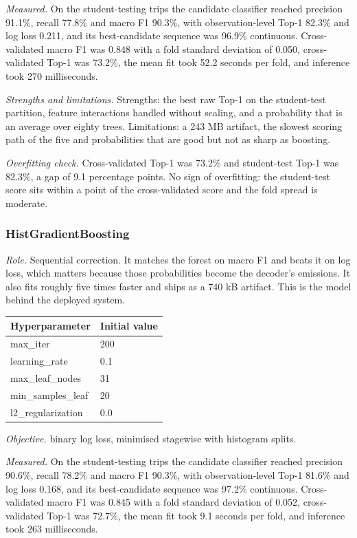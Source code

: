 \documentclass[11pt,a4paper]{article}
\begin{document}
\noindent\textit{Measured.} On the student-testing trips the candidate classifier reached precision 91.1\%, recall 77.8\% and macro F1 90.3\%, with observation-level Top-1 82.3\% and log loss 0.211, and its best-candidate sequence was 96.9\% continuous. Cross-validated macro F1 was 0.848 with a fold standard deviation of 0.050, cross-validated Top-1 was 73.2\%, the mean fit took 52.2 seconds per fold, and inference took 270 milliseconds.

\noindent\textit{Strengths and limitations.} Strengths: the best raw Top-1 on the student-test partition, feature interactions handled without scaling, and a probability that is an average over eighty trees. Limitations: a 243 MB artifact, the slowest scoring path of the five and probabilities that are good but not as sharp as boosting.

\noindent\textit{Overfitting check.} Cross-validated Top-1 was 73.2\% and student-test Top-1 was 82.3\%, a gap of 9.1 percentage points. No sign of overfitting: the student-test score sits within a point of the cross-validated score and the fold spread is moderate.

\subsubsection*{HistGradientBoosting}
\noindent\textit{Role.} Sequential correction. It matches the forest on macro F1 and beats it on log loss, which matters because those probabilities become the decoder's emissions. It also fits roughly five times faster and ships as a 740 kB artifact. This is the model behind the deployed system.

\begin{center}\small\begin{tabular}{@{}ll@{}}\toprule\textbf{Hyperparameter} & \textbf{Initial value} \\ \midrule
max\_iter & 200 \\
learning\_rate & 0.1 \\
max\_leaf\_nodes & 31 \\
min\_samples\_leaf & 20 \\
l2\_regularization & 0.0 \\
\bottomrule\end{tabular}\end{center}

\noindent\textit{Objective.} binary log loss, minimised stagewise with histogram splits.

\noindent\textit{Measured.} On the student-testing trips the candidate classifier reached precision 90.6\%, recall 78.2\% and macro F1 90.3\%, with observation-level Top-1 81.6\% and log loss 0.168, and its best-candidate sequence was 97.2\% continuous. Cross-validated macro F1 was 0.845 with a fold standard deviation of 0.052, cross-validated Top-1 was 72.7\%, the mean fit took 9.1 seconds per fold, and inference took 263 milliseconds.
\end{document}
